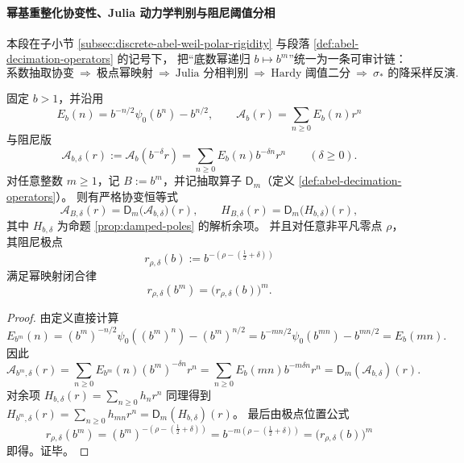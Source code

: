 \paragraph{幂基重整化协变性、Julia 动力学判别与阻尼阈值分相}\label{par:xi-discrete-abel-weil-powerbase-julia-threshold-laws}
本段在子小节 \ref{subsec:discrete-abel-weil-polar-rigidity} 与段落 \ref{def:abel-decimation-operators} 的记号下，
把“底数幂递归 \(b\mapsto b^m\)”统一为一条可审计链：
\[
\text{系数抽取协变}\ \Longrightarrow\ \text{极点幂映射}\ \Longrightarrow\ \text{Julia 分相判别}\ \Longrightarrow\ \text{Hardy 阈值二分}\ \Longrightarrow\ \sigma_* \text{ 的降采样反演}.
\]

\begin{theorem}[幂基重整化协变性与零点极点幂映射]\label{thm:xi-abel-powerbase-covariance-pole-power-map}
固定 \(b>1\)，并沿用
\[
E_b(n)=b^{-n/2}\psi_0(b^n)-b^{n/2},\qquad
\mathcal A_b(r)=\sum_{n\ge 0}E_b(n)r^n
\]
与阻尼版
\[
\mathcal A_{b,\delta}(r):=\mathcal A_b(b^{-\delta}r)=\sum_{n\ge 0}E_b(n)b^{-\delta n}r^n\qquad(\delta\ge 0).
\]
对任意整数 \(m\ge 1\)，记 \(B:=b^m\)，并记抽取算子 \(\mathsf D_m\)（定义 \ref{def:abel-decimation-operators}）。
则有严格协变恒等式
\[
\mathcal A_{B,\delta}(r)=\mathsf D_m\!\bigl(\mathcal A_{b,\delta}\bigr)(r),
\qquad
H_{B,\delta}(r)=\mathsf D_m\!\bigl(H_{b,\delta}\bigr)(r),
\]
其中 \(H_{b,\delta}\) 为命题 \ref{prop:damped-poles} 的解析余项。
并且对任意非平凡零点 \(\rho\)，其阻尼极点
\[
r_{\rho,\delta}(b):=b^{-(\rho-(\frac12+\delta))}
\]
满足幂映射闭合律
\[
r_{\rho,\delta}(b^m)=\bigl(r_{\rho,\delta}(b)\bigr)^m.
\]
\end{theorem}

\begin{proof}
由定义直接计算
\[
E_{b^m}(n)
=(b^m)^{-n/2}\psi_0((b^m)^n)-(b^m)^{n/2}
=b^{-mn/2}\psi_0(b^{mn})-b^{mn/2}
=E_b(mn).
\]
因此
\[
\mathcal A_{b^m,\delta}(r)
=\sum_{n\ge 0}E_{b^m}(n)(b^m)^{-\delta n}r^n
=\sum_{n\ge 0}E_b(mn)b^{-m\delta n}r^n
=\mathsf D_m(\mathcal A_{b,\delta})(r).
\]
对余项
\(
H_{b,\delta}(r)=\sum_{n\ge 0}h_n r^n
\)
同理得到
\(
H_{b^m,\delta}(r)=\sum_{n\ge 0}h_{mn}r^n=\mathsf D_m(H_{b,\delta})(r)
\)。
最后由极点位置公式
\[
r_{\rho,\delta}(b^m)
=(b^m)^{-(\rho-(\frac12+\delta))}
=b^{-m(\rho-(\frac12+\delta))}
=\bigl(r_{\rho,\delta}(b)\bigr)^m
\]
即得。证毕。
\end{proof}

